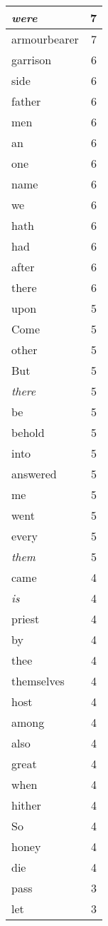 \begin{center}
\begin{longtable}{l|r}
\emph{were} & 7 \\ \hline
armourbearer & 7 \\ \hline
garrison & 6 \\ \hline
side & 6 \\ \hline
father & 6 \\ \hline
men & 6 \\ \hline
an & 6 \\ \hline
one & 6 \\ \hline
name & 6 \\ \hline
we & 6 \\ \hline
hath & 6 \\ \hline
had & 6 \\ \hline
after & 6 \\ \hline
there & 6 \\ \hline
upon & 5 \\ \hline
Come & 5 \\ \hline
other & 5 \\ \hline
But & 5 \\ \hline
\emph{there} & 5 \\ \hline
be & 5 \\ \hline
behold & 5 \\ \hline
into & 5 \\ \hline
answered & 5 \\ \hline
me & 5 \\ \hline
went & 5 \\ \hline
every & 5 \\ \hline
\emph{them} & 5 \\ \hline
came & 4 \\ \hline
\emph{is} & 4 \\ \hline
priest & 4 \\ \hline
by & 4 \\ \hline
thee & 4 \\ \hline
themselves & 4 \\ \hline
host & 4 \\ \hline
among & 4 \\ \hline
also & 4 \\ \hline
great & 4 \\ \hline
when & 4 \\ \hline
hither & 4 \\ \hline
So & 4 \\ \hline
honey & 4 \\ \hline
die & 4 \\ \hline
pass & 3 \\ \hline
let & 3 \\ \hline

\end{longtable}
\end{center}

